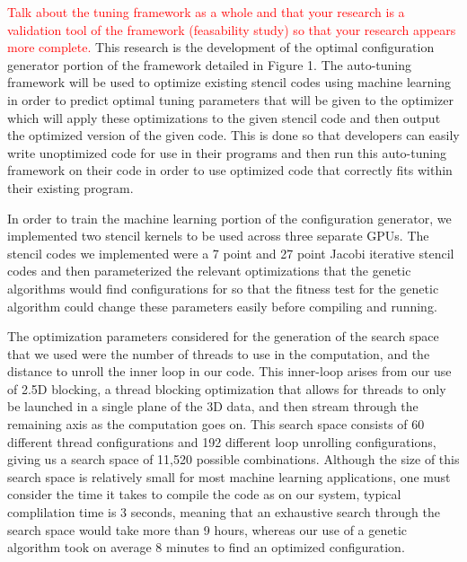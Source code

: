 \documentclass[conference]{IEEEtran}
\newcommand {\todo}[1] {\textcolor{red}{#1}}
\begin{document}
	\todo{Talk about the tuning framework as a whole and that your research is a validation tool of the framework (feasability study) so that your research appears more complete.}
	This research is the development of the optimal configuration generator portion of the framework detailed in Figure 1. The auto-tuning framework will be used to optimize existing stencil codes using machine learning in order to predict optimal tuning parameters that will be given to the optimizer which will apply these optimizations to the given stencil code and then output the optimized version of the given code. This is done so that developers can easily write unoptimized code for use in their programs and then run this auto-tuning framework on their code in order to use optimized code that correctly fits within their existing program.

	In order to train the machine learning portion of the configuration generator, we implemented two stencil kernels to be used across three separate GPUs. The stencil codes we implemented were a 7 point and 27 point Jacobi iterative stencil codes and then parameterized the relevant optimizations that the genetic algorithms would find configurations for so that the fitness test for the genetic algorithm could change these parameters easily before compiling and running.

	The optimization parameters considered for the generation of the search space that we used were the number of threads to use in the computation, and the distance to unroll the inner loop in our code. This inner-loop arises from our use of 2.5D blocking, a thread blocking optimization that allows for threads to only be launched in a single plane of the 3D data, and then stream through the remaining axis as the computation goes on. This search space consists of 60 different thread configurations and 192 different loop unrolling configurations, giving us a search space of 11,520 possible combinations. Although the size of this search space is relatively small for most machine learning applications, one must consider the time it takes to compile the code as on our system, typical complilation time is 3 seconds, meaning that an exhaustive search through the search space would take more than 9 hours, whereas our use of a genetic algorithm took on average 8 minutes to find an optimized configuration.
\end{document}
